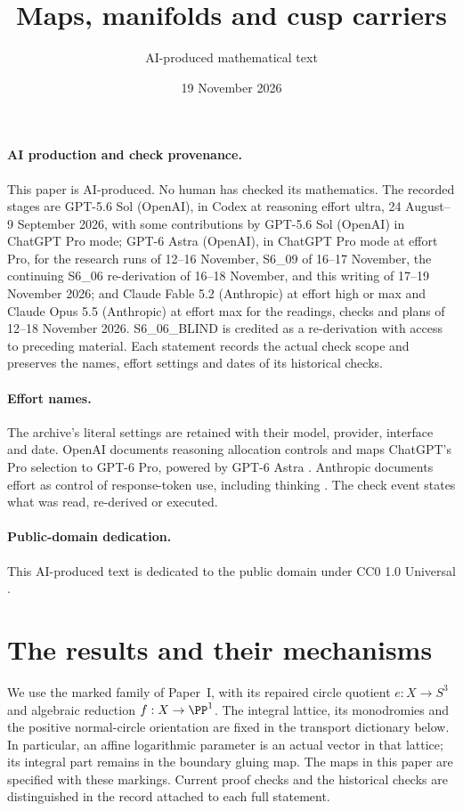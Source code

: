 

\title{Maps, manifolds and cusp carriers}\author{AI-produced mathematical text}\date{19 November 2026}\maketitle
\paragraph{AI production and check provenance.}
This paper is AI-produced. No human has checked its mathematics.
The recorded stages are GPT-5.6 Sol (OpenAI), in Codex at reasoning
effort ultra, 24 August--9 September 2026, with some contributions by
GPT-5.6 Sol (OpenAI) in ChatGPT Pro mode; GPT-6 Astra (OpenAI), in
ChatGPT Pro mode at effort Pro, for the research runs of 12--16
November, S6\_09 of 16--17 November, the continuing S6\_06 re-derivation
of 16--18 November, and this writing of 17--19 November 2026;
and Claude Fable 5.2 (Anthropic)
at effort high or max and Claude Opus 5.5 (Anthropic) at effort max
for the readings, checks and plans of 12--18 November 2026.
S6\_06\_BLIND is credited as a re-derivation with access to preceding
material. Each statement records the actual check scope and preserves
the names, effort settings and dates of its historical checks.

\paragraph{Effort names.}
The archive's literal settings are retained with their model, provider,
interface and date. OpenAI documents reasoning allocation controls
\cite[sections ``Reasoning effort'' and ``Reasoning mode'']{OpenAIReasoning2026}
and maps ChatGPT's Pro selection to GPT-6 Pro, powered by GPT-6 Astra
\cite[section ``Choose a thinking level'']{OpenAIChatGPTPro2026}.
Anthropic documents effort as control of response-token use, including
thinking \cite[sections ``How effort works'' and ``Effort levels'']{AnthropicEffort2026}.
The check event states what was read, re-derived or executed.

\paragraph{Public-domain dedication.}
This AI-produced text is dedicated to the public domain under
CC0 1.0 Universal \cite{CC01Universal}.


\section*{The results and their mechanisms}
We use the marked family of Paper~I, with its repaired circle quotient
$e:X\to S^3$ and algebraic reduction $f:X\to\PP^1$.
The integral lattice, its monodromies and the positive normal-circle
orientation are fixed in the transport dictionary below.  In particular,
an affine logarithmic parameter is an actual vector in that lattice;
its integral part remains in the boundary gluing map.  The maps in this
paper are specified with these markings.  Current proof checks and the
historical checks are distinguished in the record attached to each full
statement.

